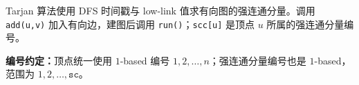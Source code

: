 Tarjan 算法使用 DFS 时间戳与 low-link 值求有向图的强连通分量。调用 \texttt{add(u,v)} 加入有向边，建图后调用 \texttt{run()}；\texttt{scc[u]} 是顶点 $u$ 所属的强连通分量编号。

\textbf{编号约定：}顶点统一使用 $1$-based 编号 $1,2,\ldots,n$；强连通分量编号也是 $1$-based，范围为 $1,2,\ldots,\texttt{sc}$。
